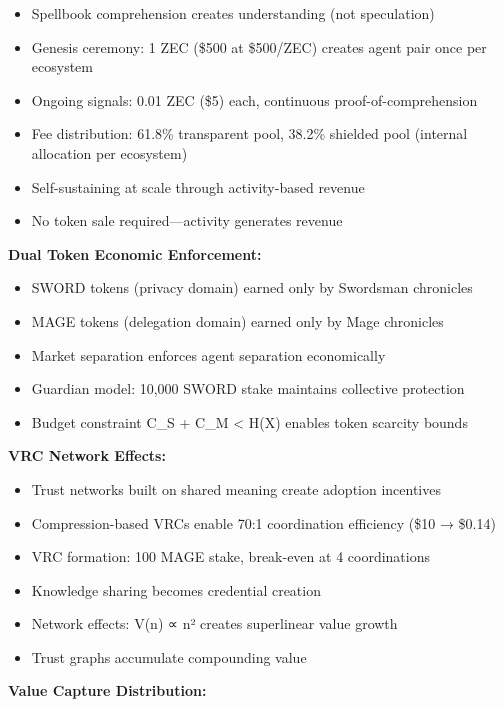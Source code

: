 \documentclass[
]{article}
\begin{document}
\begin{itemize}
\item
  Spellbook comprehension creates understanding (not speculation)
\item
  Genesis ceremony: 1 ZEC (\$500 at \$500/ZEC) creates agent pair once
  per ecosystem
\item
  Ongoing signals: 0.01 ZEC (\$5) each, continuous
  proof-of-comprehension
\item
  Fee distribution: 61.8\% transparent pool, 38.2\% shielded pool
  (internal allocation per ecosystem)
\item
  Self-sustaining at scale through activity-based revenue
\item
  No token sale required---activity generates revenue
\end{itemize}

\textbf{Dual Token Economic Enforcement:}

\begin{itemize}
\item
  SWORD tokens (privacy domain) earned only by Swordsman chronicles
\item
  MAGE tokens (delegation domain) earned only by Mage chronicles
\item
  Market separation enforces agent separation economically
\item
  Guardian model: 10,000 SWORD stake maintains collective protection
\item
  Budget constraint C\_S + C\_M \textless{} H(X) enables token scarcity
  bounds
\end{itemize}

\textbf{VRC Network Effects:}

\begin{itemize}
\item
  Trust networks built on shared meaning create adoption incentives
\item
  Compression-based VRCs enable 70:1 coordination efficiency (\$10 →
  \$0.14)
\item
  VRC formation: 100 MAGE stake, break-even at 4 coordinations
\item
  Knowledge sharing becomes credential creation
\item
  Network effects: V(n) ∝ n² creates superlinear value growth
\item
  Trust graphs accumulate compounding value
\end{itemize}

\textbf{Value Capture Distribution:}
\end{document}
